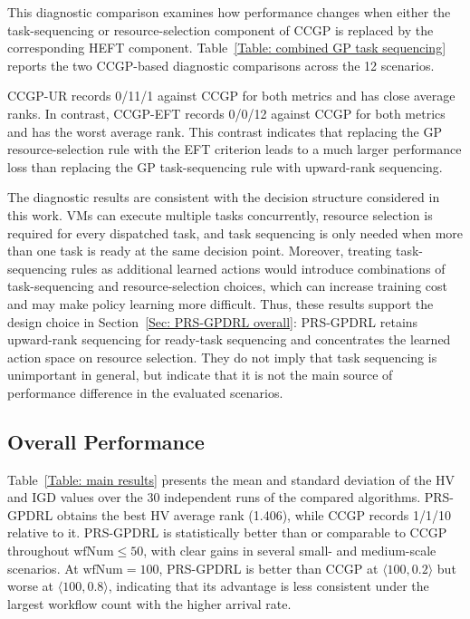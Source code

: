 \documentclass[10pt,journal]{IEEEtran}
\begin{document}
This diagnostic comparison examines how performance changes when either the task-sequencing or resource-selection component of CCGP is replaced by the corresponding HEFT component. Table~\ref{Table: combined GP task sequencing} reports the two CCGP-based diagnostic comparisons across the 12 scenarios.

CCGP-UR records 0/11/1 against CCGP for both metrics and has close average ranks. In contrast, CCGP-EFT records 0/0/12 against CCGP for both metrics and has the worst average rank. This contrast indicates that replacing the GP resource-selection rule with the EFT criterion leads to a much larger performance loss than replacing the GP task-sequencing rule with upward-rank sequencing.

The diagnostic results are consistent with the decision structure considered in this work. VMs can execute multiple tasks concurrently, resource selection is required for every dispatched task, and task sequencing is only needed when more than one task is ready at the same decision point. Moreover, treating task-sequencing rules as additional learned actions would introduce combinations of task-sequencing and resource-selection choices, which can increase training cost and may make policy learning more difficult. Thus, these results support the design choice in Section~\ref{Sec: PRS-GPDRL overall}: PRS-GPDRL retains upward-rank sequencing for ready-task sequencing and concentrates the learned action space on resource selection. They do not imply that task sequencing is unimportant in general, but indicate that it is not the main source of performance difference in the evaluated scenarios.

\subsection{Overall Performance}
\label{Sec: overall performance}
Table~\ref{Table: main results} presents the mean and standard deviation of the HV and IGD values over the 30 independent runs of the compared algorithms.
PRS-GPDRL obtains the best HV average rank (1.406), while CCGP records 1/1/10 relative to it. PRS-GPDRL is statistically better than or comparable to CCGP throughout $\mathrm{wfNum}\leq 50$, with clear gains in several small- and medium-scale scenarios. At $\mathrm{wfNum}=100$, PRS-GPDRL is better than CCGP at $\langle100,0.2\rangle$ but worse at $\langle100,0.8\rangle$, indicating that its advantage is less consistent under the largest workflow count with the higher arrival rate.
\end{document}
